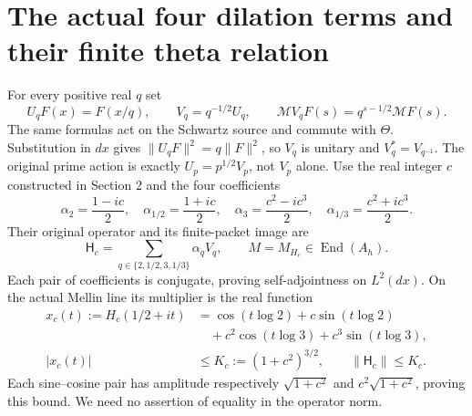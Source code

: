 \documentclass[11pt]{article}
\newcommand{\MM}{\mathcal M}
\newcommand{\HS}{\mathsf H_c}
\begin{document}
\section{The actual four dilation terms and their finite theta relation}
For every positive real $q$ set
\begin{equation}
 U_qF(x)=F(x/q),\qquad V_q=q^{-1/2}U_q,\qquad
 \MM V_qF(s)=q^{s-1/2}\MM F(s).\label{eq:Vq}
\end{equation}
The same formulas act on the Schwartz source and commute with $\Theta$.
Substitution in $dx$ gives $\|U_qF\|^2=q\|F\|^2$, so $V_q$ is unitary
and $V_q^*=V_{q^{-1}}$. The original prime action is exactly
$U_p=p^{1/2}V_p$, not $V_p$ alone.
Use the real integer $c$ constructed in Section 2 and the four coefficients
\begin{equation}
 \alpha_2=\frac{1-ic}{2},\quad\alpha_{1/2}=\frac{1+ic}{2},\quad
 \alpha_3=\frac{c^2-ic^3}{2},\quad\alpha_{1/3}=\frac{c^2+ic^3}{2}.
 \label{eq:alphas}
\end{equation}
Their original operator and its finite-packet image are
\begin{equation}
 \HS=\sum_{q\in\{2,1/2,3,1/3\}}\alpha_q V_q,
 \qquad M=M_{H_c}\in\operatorname{End}(A_h).
 \label{eq:operator}
\end{equation}
Each pair of coefficients is conjugate, proving self-adjointness on
$L^2(dx)$. On the actual Mellin line its multiplier is the real function
\begin{align}
 x_c(t):=H_c(1/2+it)
 &=\cos(t\log2)+c\sin(t\log2)\nonumber\\
 &\quad+c^2\cos(t\log3)+c^3\sin(t\log3),\nonumber\\
 |x_c(t)|&\le K_c:=(1+c^2)^{3/2},\qquad\|\HS\|\le K_c.
 \label{eq:bound}
\end{align}
Each sine--cosine pair has amplitude respectively
$\sqrt{1+c^2}$ and $c^2\sqrt{1+c^2}$, proving this bound.
We need no assertion of equality in the operator norm.
\end{document}
